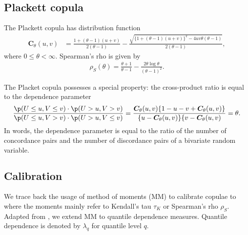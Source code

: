 \subsection{Plackett copula}\label{subsec:other-copula}
The Plackett copula has distribution function
\begin{align*}
    \bm{C}_{\theta}(u,v) &= \frac{1+(\theta-1)(u+v)}{2(\theta-1)}
                         - \frac{\sqrt{\{
    1+(\theta-1)(u+v)\}^2 - 4uv\theta(\theta-1)}}{2(\theta-1)},
\end{align*} where $0 \leq \theta < \infty$.
Spearman's rho is given by 
\begin{align*}
    \rho_S(\theta) = \frac{\theta+1}{\theta-1} - \frac{2\theta \log
  \theta}{(\theta-1)^2}. 
    \end{align*}

The Placket copula possesses a special property:
the cross-product ratio is equal to the dependence parameter
\begin{equation} \label{eq:PlackettCrossProduct}
    \frac{\p(U \leq u, V \leq v) \cdot \p(U > u, V > v)}
    {\p(U \leq u, V > v) \cdot \p(U > u, V \leq v)}\nonumber
    =
      \frac{\bm{C}_\theta(u,v)\{1-u-v+\bm{C}_\theta(u,v)\}}{\{u-\bm{C}_\theta(u,v)\}\{v-\bm{C}_\theta(u,v)}\nonumber 
    = \theta.
\end{equation}
In words, the dependence parameter is equal to the ratio of the 
number of concordance pairs and the number of discordance pairs of a 
bivariate random variable. 

\subsection{Calibration}\label{sec:estimation}
We trace back the usage of method of moments (MM) to calibrate copulae to \citet{Genest1987, genest1993statistical} 
where the moments mainly refer to Kendall's tau $\tau_K$ or Spearman's rho $\rho_S$.
Adapted from \cite{oh2013simulated}, we extend MM to quantile dependence measures. 
Quantile dependence is denoted by $\lambda_q$ for quantile level $q$.

